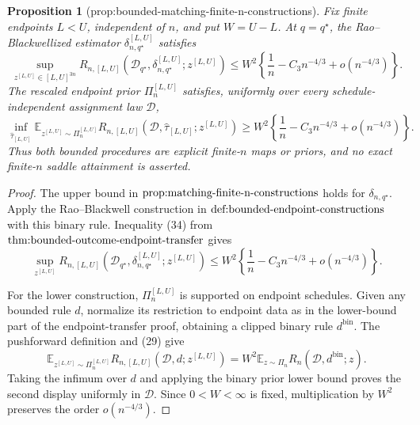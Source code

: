 \documentclass{article}
\newtheorem{proposition}{Proposition}
\begin{document}
\begin{proposition}[prop:bounded-matching-finite-n-constructions]\label{prop:bounded-matching-finite-n-constructions}
Fix finite endpoints \(L<U\), independent of \(n\), and put \(W=U-L\).  At \(q=q^\star\), the Rao--Blackwellized estimator \(\delta_{n,q^\star}^{[L,U]}\) satisfies
\[
\sup_{z^{[L,U]}\in[L,U]^{3n}}
R_{n,[L,U]}(\mathcal D_{q^\star},\delta_{n,q^\star}^{[L,U]};z^{[L,U]})
\leq W^2\left\{\frac1n-C_3n^{-4/3}+o(n^{-4/3})\right\}.
\]
The rescaled endpoint prior \(\Pi_n^{[L,U]}\) satisfies, uniformly over every schedule-independent assignment law \(\mathcal D\),
\[
\inf_{\widehat\tau_{[L,U]}}
\mathbb E_{z^{[L,U]}\sim\Pi_n^{[L,U]}}
R_{n,[L,U]}(\mathcal D,\widehat\tau_{[L,U]};z^{[L,U]})
\geq W^2\left\{\frac1n-C_3n^{-4/3}+o(n^{-4/3})\right\}.
\]
Thus both bounded procedures are explicit finite-\(n\) maps or priors, and no exact finite-\(n\) saddle attainment is asserted.
\end{proposition}
\begin{proof}
The upper bound in \(\textnormal{prop:matching-finite-n-constructions}\) holds for \(\delta_{n,q^\star}\).  Apply the Rao--Blackwell construction in \(\textnormal{def:bounded-endpoint-constructions}\) with this binary rule.  Inequality (34) from \(\textnormal{thm:bounded-outcome-endpoint-transfer}\) gives
\[
\sup_{z^{[L,U]}}R_{n,[L,U]}(\mathcal D_{q^\star},
\delta_{n,q^\star}^{[L,U]};z^{[L,U]})
\leq W^2\left\{\frac1n-C_3n^{-4/3}+o(n^{-4/3})\right\}.
\]

For the lower construction, \(\Pi_n^{[L,U]}\) is supported on endpoint schedules.  Given any bounded rule \(d\), normalize its restriction to endpoint data as in the lower-bound part of the endpoint-transfer proof, obtaining a clipped binary rule \(d^{\mathrm{bin}}\).  The pushforward definition and (29) give
\[
\mathbb E_{z^{[L,U]}\sim\Pi_n^{[L,U]}}
R_{n,[L,U]}(\mathcal D,d;z^{[L,U]})
=W^2\mathbb E_{z\sim\Pi_n}R_n(\mathcal D,d^{\mathrm{bin}};z).
\]
Taking the infimum over \(d\) and applying the binary prior lower bound proves the second display uniformly in \(\mathcal D\).  Since \(0<W<\infty\) is fixed, multiplication by \(W^2\) preserves the order \(o(n^{-4/3})\).
\end{proof}
\end{document}
